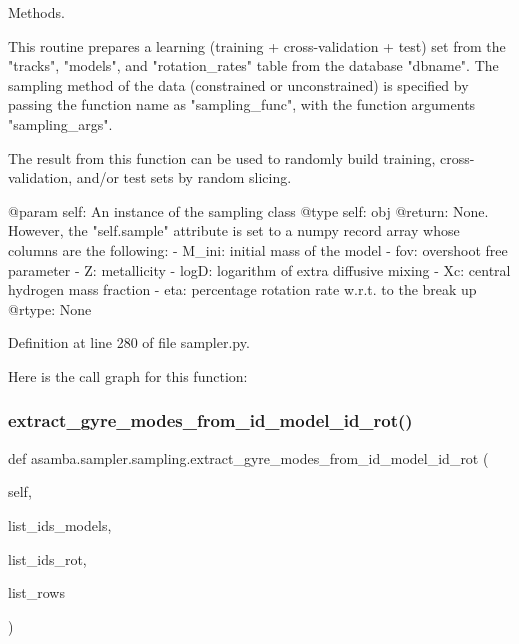 Methods. 

\begin{DoxyVerb}This routine prepares a learning (training + cross-validation + test) set from the "tracks", "models",
and "rotation_rates" table from the database "dbname". The sampling method of the data (constrained or
unconstrained) is specified by passing the function name as "sampling_func", with the function arguments
"sampling_args".

The result from this function can be used to randomly build training, cross-validation, and/or test
sets by random slicing.

@param self: An instance of the sampling class
@type self: obj
@return: None. However, the "self.sample" attribute is set to a numpy record array whose columns are
  the following:
  - M_ini: initial mass of the model
  - fov: overshoot free parameter
  - Z: metallicity
  - logD: logarithm of extra diffusive mixing
  - Xc: central hydrogen mass fraction
  - eta: percentage rotation rate w.r.t. to the break up
@rtype: None
\end{DoxyVerb}
 

Definition at line 280 of file sampler.\+py.

Here is the call graph for this function\+:
\mbox{\label{classasamba_1_1sampler_1_1sampling_abdedb54b26dfc7605977d2103ce050b0}} 
\subsubsection{\texorpdfstring{extract\+\_\+gyre\+\_\+modes\+\_\+from\+\_\+id\+\_\+model\+\_\+id\+\_\+rot()}{extract\_gyre\_modes\_from\_id\_model\_id\_rot()}}
{\footnotesize\ttfamily def asamba.\+sampler.\+sampling.\+extract\+\_\+gyre\+\_\+modes\+\_\+from\+\_\+id\+\_\+model\+\_\+id\+\_\+rot (\begin{DoxyParamCaption}\item[{}]{self,  }\item[{}]{list\+\_\+ids\+\_\+models,  }\item[{}]{list\+\_\+ids\+\_\+rot,  }\item[{}]{list\+\_\+rows }\end{DoxyParamCaption})}

